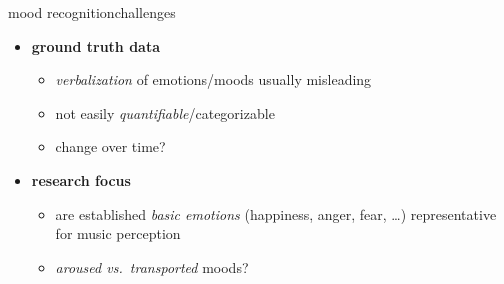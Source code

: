         \begin{frame}{mood recognition}{challenges}
            \begin{itemize}
                \item   \textbf{ground truth data}
                    \begin{itemize}
                        \item   \textit{verbalization} of emotions/moods usually misleading
                        \item   not easily \textit{quantifiable}/categorizable
                        \item   change over time?
                    \end{itemize}
                \bigskip
                \item   \textbf{research focus}
                    \begin{itemize}
                        \item<2->	are established \textit{basic emotions} (happiness, anger, fear, \ldots) representative for music perception
                        \item<3->	\textit{aroused vs.\ transported} moods?
                    \end{itemize}
            \end{itemize}
        \end{frame}
                
